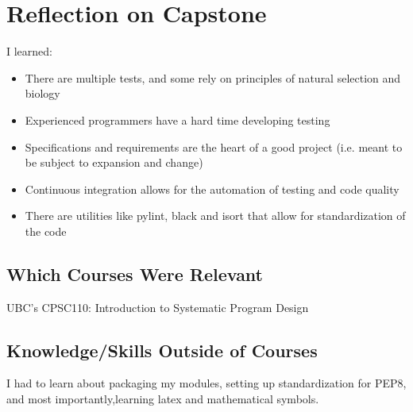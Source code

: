 \documentclass{article}
\begin{document}
\section{Reflection on Capstone}

I learned:
\begin{itemize}
    \item There are multiple tests, and some rely on principles of natural selection and biology
    \item Experienced programmers have a hard time developing testing
    \item Specifications and requirements are the heart of a good project (i.e. meant to be subject to expansion and change)
    \item Continuous integration allows for the automation of testing and code quality
    \item There are utilities like pylint, black and isort that allow for standardization of the code
\end{itemize}

\subsection{Which Courses Were Relevant}

UBC's CPSC110: Introduction to Systematic Program Design

\subsection{Knowledge/Skills Outside of Courses}

I had to learn about packaging my modules, setting up standardization for PEP8, and most importantly,learning 
latex and mathematical symbols.

   
   
\end{document}
